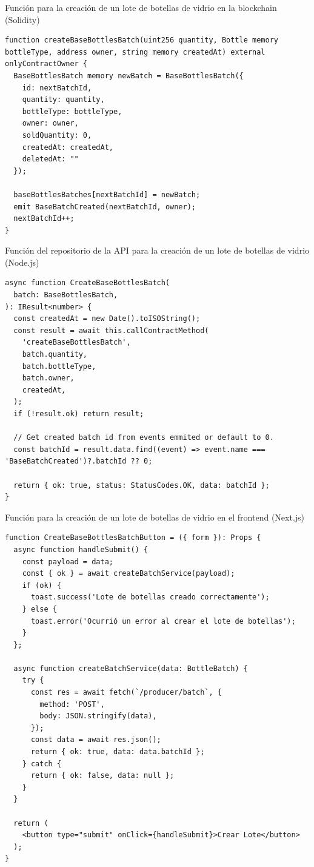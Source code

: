 \begin{listing}[!tb]
\caption{Función para la creación de un lote de botellas de vidrio en la blockchain (Solidity)}
\label{listing:solidity-create-batch-code}
\begin{verbatim}
function createBaseBottlesBatch(uint256 quantity, Bottle memory bottleType, address owner, string memory createdAt) external onlyContractOwner {
  BaseBottlesBatch memory newBatch = BaseBottlesBatch({
    id: nextBatchId,
    quantity: quantity,
    bottleType: bottleType,
    owner: owner,
    soldQuantity: 0,
    createdAt: createdAt,
    deletedAt: ""
  });

  baseBottlesBatches[nextBatchId] = newBatch;
  emit BaseBatchCreated(nextBatchId, owner);
  nextBatchId++;
}
\end{verbatim}
\end{listing}

\begin{listing}[!tb]
\caption{Función del repositorio de la API para la creación de un lote de botellas de vidrio (Node.js)}
\label{listing:api-create-batch-code}
\begin{verbatim}
async function CreateBaseBottlesBatch(
  batch: BaseBottlesBatch,
): IResult<number> {
  const createdAt = new Date().toISOString();
  const result = await this.callContractMethod(
    'createBaseBottlesBatch',
    batch.quantity,
    batch.bottleType,
    batch.owner,
    createdAt,
  );
  if (!result.ok) return result;

  // Get created batch id from events emmited or default to 0.
  const batchId = result.data.find((event) => event.name === 'BaseBatchCreated')?.batchId ?? 0;

  return { ok: true, status: StatusCodes.OK, data: batchId };
}
\end{verbatim}
\end{listing}

\begin{listing}[!tb]
\caption{Función para la creación de un lote de botellas de vidrio en el frontend (Next.js)}
\label{listing:frontend-create-batch-code}
\begin{verbatim}
function CreateBaseBottlesBatchButton = ({ form }): Props {
  async function handleSubmit() {
    const payload = data;
    const { ok } = await createBatchService(payload);
    if (ok) {
      toast.success('Lote de botellas creado correctamente');
    } else {
      toast.error('Ocurrió un error al crear el lote de botellas');
    }
  };

  async function createBatchService(data: BottleBatch) {
    try {
      const res = await fetch(`/producer/batch`, {
        method: 'POST',
        body: JSON.stringify(data),
      });
      const data = await res.json();
      return { ok: true, data: data.batchId };
    } catch {
      return { ok: false, data: null };
    }
  }

  return (
    <button type="submit" onClick={handleSubmit}>Crear Lote</button>
  );
}
\end{verbatim}
\end{listing}

